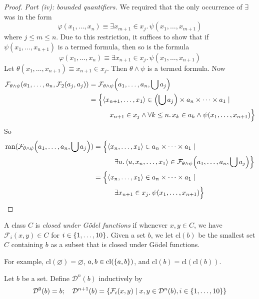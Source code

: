 \begin{proof}
    \emph{Part (iv): bounded quantifiers.}
    We required that the only occurrence of \( \exists \) was in the form
    \[ \varphi(x_1, \dots, x_n) \equiv \exists x_{m+1} \in x_j.\, \psi(x_1, \dots, x_{m+1}) \]
    where \( j \leq m \leq n \).
    Due to this restriction, it suffices to show that if \( \psi(x_1, \dots, x_{n+1}) \) is a termed formula, then so is the formula
    \[ \varphi(x_1, \dots, x_n) \equiv \exists x_{n+1} \in x_j.\, \psi(x_1, \dots, x_{n+1}) \]
    Let \( \theta(x_1, \dots, x_{n+1}) \equiv x_{n+1} \in x_j \).
    Then \( \theta \wedge \psi \) is a termed formula.
    Now
    \begin{align*}
        \mathcal F_{\theta \wedge \psi}(a_1, \dots, a_n, \mathcal F_2(a_j, a_j)) &= \mathcal F_{\theta \wedge \psi}\qty(a_1, \dots, a_n, \bigcup a_j) \\
        &= \Big\{\langle x_{n+1}, \dots, x_1 \rangle \in \qty(\bigcup a_j) \times a_n \times \dots \times a_1 \mid \\
        &\quad\quad\quad x_{n+1} \in x_j \wedge \forall k \leq n.\, x_k \in a_k \wedge \psi(x_1, \dots, x_{n+1})\Big\}
    \end{align*}
    So
    \begin{align*}
        \operatorname{ran}(\mathcal F_{\theta \wedge \psi}\qty(a_1, \dots, a_n, \bigcup a_j))
        &= \Big\{\langle x_n, \dots, x_1 \rangle \in a_n \times \dots \times a_1 \mid \\
        &\quad\quad\quad \exists u.\, \langle u, x_n, \dots, x_1 \rangle \in \mathcal F_{\theta \wedge \psi}\qty(a_1, \dots, a_n, \bigcup a_j)\Big\} \\
        &= \Big\{\langle x_n, \dots, x_1 \rangle \in a_n \times \dots \times a_1 \mid \\
        &\quad\quad\quad \exists x_{n+1} \in x_j.\, \psi(x_1, \dots, x_{n+1})\Big\}
    \end{align*}
\end{proof}
\begin{definition}
    A class \( C \) is \emph{closed under G\"odel functions} if whenever \( x, y \in C \), we have \( \mathcal F_i(x, y) \in C \) for \( i \in \qty{1, \dots, 10} \).
    Given a set \( b \), we let \( \mathrm{cl}(b) \) be the smallest set \( C \) containing \( b \) as a subset that is closed under G\"odel functions.
\end{definition}
For example, \( \mathrm{cl}(\varnothing) = \varnothing \), \( a, b \in \mathrm{cl}(\qty{a, b}) \), and \( \mathrm{cl}(b) = \mathrm{cl}(\mathrm{cl}(b)) \).
\begin{definition}
    Let \( b \) be a set.
    Define \( \mathcal D^n(b) \) inductively by
    \[ \mathcal D^0(b) = b;\quad \mathcal D^{n+1}(b) = \qty{\mathcal F_i(x, y) \mid x, y \in \mathcal D^n(b), i \in \qty{1, \dots, 10}} \]
\end{definition}
